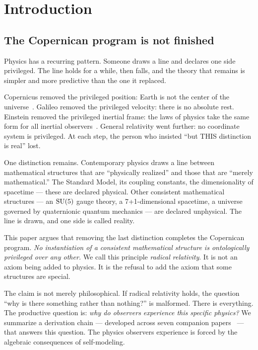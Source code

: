 
\section{Introduction}
\label{sec:introduction}

\subsection{The Copernican program is not finished}
\label{subsec:copernican}

Physics has a recurring pattern.  Someone draws a line and declares
one side privileged.  The line holds for a while, then falls, and the
theory that remains is simpler and more predictive than the one it
replaced.

Copernicus removed the privileged position: Earth is not the center of
the universe~\citep{copernicus1543}.  Galileo removed the privileged
velocity: there is no absolute rest.  Einstein removed the privileged
inertial frame: the laws of physics take the same form for all
inertial observers~\citep{einstein1905}.  General relativity went
further: no coordinate system is privileged.  At each step, the
person who insisted ``but THIS distinction is real'' lost.

One distinction remains.  Contemporary physics draws a line between
mathematical structures that are ``physically realized'' and those
that are ``merely mathematical.''  The Standard Model, its coupling
constants, the dimensionality of spacetime --- these are declared
physical.  Other consistent mathematical structures --- an $\mathrm{SU}(5)$
gauge theory, a 7+1-dimensional spacetime, a universe governed by
quaternionic quantum mechanics --- are declared unphysical.  The line
is drawn, and one side is called reality.

This paper argues that removing the last distinction completes the
Copernican program.  \emph{No instantiation of a consistent
mathematical structure is ontologically privileged over any other.}
We call this principle \emph{radical relativity}.  It is not an axiom
being added to physics.  It is the refusal to add the axiom that some
structures are special.

The claim is not merely philosophical.  If radical relativity holds,
the question ``why is there something rather than nothing?'' is
malformed.  There is everything.  The productive question is: \emph{why
do observers experience this specific physics?}  We summarize a
derivation chain --- developed across seven companion
papers~\citep{ehrlich2026measure,ehrlich2026bb,ehrlich2026lipschitz,ehrlich2026born,ehrlich2026qm,ehrlich2026gr,ehrlich2026sm}
--- that answers this question.  The physics observers experience is
forced by the algebraic consequences of self-modeling.

